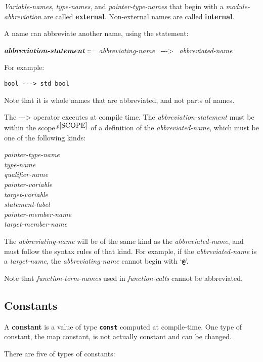 \documentclass[12pt]{article}
\newcommand{\TT}[1]{{\tt \bfseries #1}}
\newcommand{\ABV}{-{}-{}->}
\newcommand{\key}[1]{{\rm \bfseries #1}}
\newcommand{\ttkey}[1]{{\tt \bfseries #1}}
\newcommand{\emkey}[1]{{\em \bfseries #1}}
\newcommand{\pagnote}[1]{$\,^{p\pageref{#1}}$}
\newenvironment{indpar}[1][0.3in]%
	{\begin{list}{}%
		     {\setlength{\itemsep}{0in}%
		      \setlength{\topsep}{0in}%
		      \setlength{\parsep}{1ex}%
		      \setlength{\labelwidth}{#1}%
		      \setlength{\leftmargin}{#1}%
		      \addtolength{\leftmargin}{\labelsep}}%
	 \item}%
	{\end{list}}
\begin{document}
{\em Variable-names}, {\em type-names}, and {\em pointer-type-names}
that begin with a {\em module-abbreviation} are called
\key{external}\label{EXTERNAL-NAME}.
Non-external names are called \key{internal}\label{INTERNAL-NAME}.

A name can abbreviate another name, using the statement:
\begin{indpar}
\emkey{abbreviation-statement}\label{ABBREVIATION-STATEMENT} ::=
    {\em abbreviating-name}~ \ABV{}~ {\em abbreviated-name}
\end{indpar}
For example:
\begin{center}
\tt bool \ABV{} std bool
\end{center}

Note that it is whole names that are abbreviated, and not parts of
names.

The \ABV{} operator executes at compile time.  The {\em abbreviation-statement}
must be within the scope\pagnote{SCOPE}
of a definition of the {\em abbreviated-name},
which must be one of the following kinds:
\begin{center} \em
pointer-type-name \\
type-name \\
qualifier-name \\
pointer-variable \\
target-variable \\
statement-label \\
pointer-member-name \\
target-member-name
\end{center}
The {\em abbreviating-name} will be of the same kind as the
{\em abbreviated-name}, and must follow the syntax rules of that
kind.  For example, if the {\em abbreviated-name}
is a {\em target-name}, the {\em abbreviating-name} cannot begin with
`\TT{@}'.

Note that {\em function-term-names} used in {\em function-calls}
cannot be abbreviated.


\subsection{Constants}
\label{CONSTANTS}

A \key{constant} is a value of type \ttkey{const} computed at
compile-time.  One type of constant, the map constant, is not
actually constant and can be changed.

There are five of types of constants:
\end{document}
